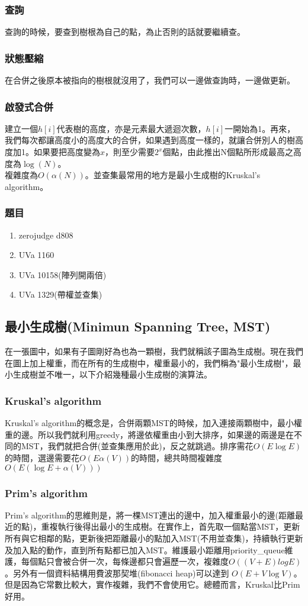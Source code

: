 \subsubsection{查詢}
查詢的時候，要查到樹根為自己的點，為止否則的話就要繼續查。
\subsubsection{狀態壓縮}
在合併之後原本被指向的樹根就沒用了，我們可以一邊做查詢時，一邊做更新。
\subsubsection{啟發式合併}
建立一個$h[i]$代表樹的高度，亦是元素最大遞迴次數，$h[i]$一開始為1。再來，我們每次都讓高度小的高度大的合併，如果遇到高度一樣的，就讓合併別人的樹高度加1。如果要把高度變為$x$，則至少需要$2^x$個點，由此推出N個點所形成最高之高度為$\log(N)$。\\

複雜度為$O(\alpha(N))$。並查集最常用的地方是最小生成樹的Kruskal’s algorithm。
\subsubsection{題目}
\begin{enumerate}
\item zerojudge d808
\item UVa 1160
\item UVa 10158(陣列開兩倍)
\item UVa 1329(帶權並查集)
\end{enumerate}
\subsection{最小生成樹(Minimun Spanning Tree, MST)}
在一張圖中，如果有子圖剛好為也為一顆樹，我們就稱該子圖為生成樹。現在我們在圖上加上權重，而在所有的生成樹中，權重最小的，我們稱為"最小生成樹"，最小生成樹並不唯一，以下介紹幾種最小生成樹的演算法。
\subsubsection{Kruskal’s algorithm}
Kruskal’s algorithm的概念是，合併兩顆MST的時候，加入連接兩顆樹中，最小權重的邊。所以我們就利用greedy，將邊依權重由小到大排序，如果邊的兩邊是在不同的MST，我們就把合併(並查集應用於此)，反之就跳過。排序需花$O(E\log E)$的時間，選邊需要花$O(E\alpha(V))$的時間，總共時間複雜度$O(E(\log E+\alpha(V)))$

\subsubsection{Prim’s algorithm}
Prim’s algorithm的思維則是，將一棵MST連出的邊中，加入權重最小的邊(距離最近的點)，重複執行後得出最小的生成樹。在實作上，首先取一個點當MST，更新所有與它相鄰的點，更新後把距離最小的點加入MST(不用並查集)，持續執行更新及加入點的動作，直到所有點都已加入MST。維護最小距離用priority\_queue維護，每個點只會被合併一次，每條邊都只會遍歷一次，複雜度$O((V+E)logE)$。另外有一個資料結構用費波那契堆(fibonacci heap)可以達到 $O(E+V\log V)$。但是因為它常數比較大，實作複雜，我們不會使用它。總體而言，Kruskal比Prim好用。
